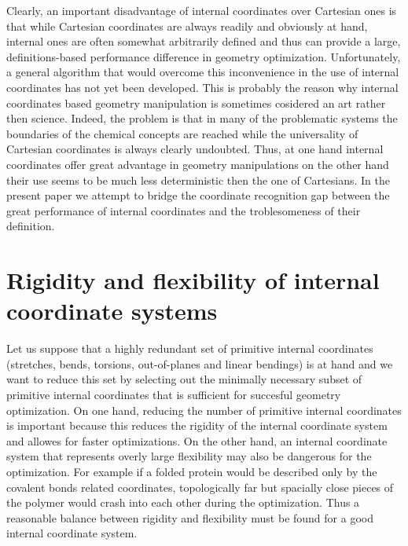 \documentclass[prl,aps,preprint,superbib,12pt]{revtex4}
\begin{document}
Clearly, an important disadvantage of internal coordinates 
over Cartesian ones
is that while Cartesian coordinates are always readily and
obviously at hand,
internal ones are often somewhat arbitrarily defined and thus
can provide a large, definitions-based performance difference
in geometry optimization. 
Unfortunately,
a general algorithm that would overcome this inconvenience in the use
of internal coordinates has not yet been developed. This is probably
the reason why internal coordinates based geometry manipulation
is sometimes cosidered an art rather then science.
Indeed, the problem is that in many of the
problematic systems the boundaries of the chemical concepts are 
reached while the universality of Cartesian coordinates is always 
clearly undoubted. Thus, at one hand internal coordinates offer
great advantage in geometry manipulations on the other hand their
use seems to be much less deterministic then the one of Cartesians.
In the present paper we attempt to bridge the coordinate recognition
gap between the great performance of internal coordinates and the 
troblesomeness of their definition.

\section{Rigidity and flexibility of internal coordinate systems}
Let us suppose that a highly redundant set of primitive
internal coordinates (stretches, bends, torsions, out-of-planes
and linear bendings) is
at hand and we want to reduce this set 
by selecting out the minimally necessary subset of 
primitive internal coordinates that is sufficient for succesful
geometry optimization.
On one hand, reducing the number of primitive internal coordinates
is important because this reduces the rigidity of the internal 
coordinate system and allowes for faster optimizations.
On the other hand, an internal coordinate system that represents
overly large flexibility may also be dangerous for the optimization.
For example if a folded protein would be described only by the covalent
bonds related coordinates, topologically far but spacially close
pieces of the polymer would crash into each other during the 
optimization. Thus a reasonable balance between rigidity and
flexibility must be found for a good internal coordinate system.
\end{document}
